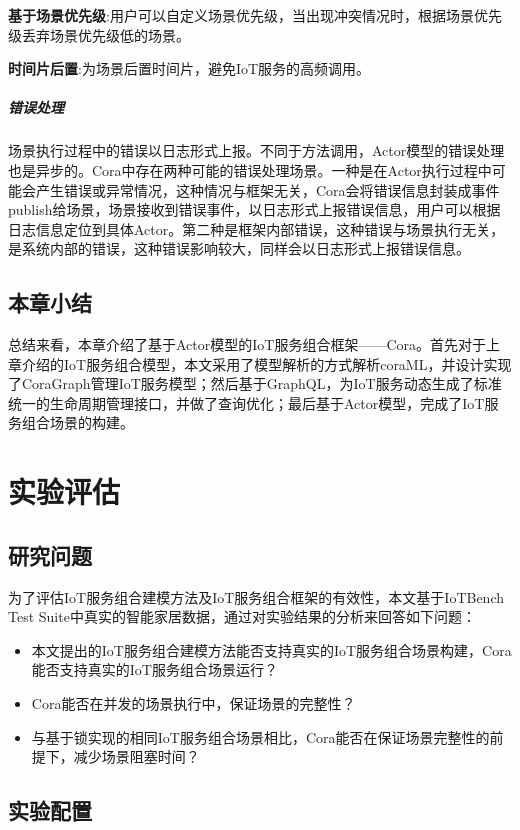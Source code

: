 \documentclass[winfonts,master,twoside]{njuthesis}
\begin{document}
\textbf{基于场景优先级}:用户可以自定义场景优先级，当出现冲突情况时，根据场景优先级丢弃场景优先级低的场景。

\textbf{时间片后置}:为场景后置时间片，避免IoT服务的高频调用。

\paragraph{错误处理}
场景执行过程中的错误以日志形式上报。不同于方法调用，Actor模型的错误处理也是异步的。Cora中存在两种可能的错误处理场景。一种是在Actor执行过程中可能会产生错误或异常情况，这种情况与框架无关，Cora会将错误信息封装成事件publish给场景，场景接收到错误事件，以日志形式上报错误信息，用户可以根据日志信息定位到具体Actor。第二种是框架内部错误，这种错误与场景执行无关，是系统内部的错误，这种错误影响较大，同样会以日志形式上报错误信息。

\section{本章小结}
总结来看，本章介绍了基于Actor模型的IoT服务组合框架——Cora。首先对于上章介绍的IoT服务组合模型，本文采用了模型解析的方式解析coraML，并设计实现了CoraGraph管理IoT服务模型；然后基于GraphQL，为IoT服务动态生成了标准统一的生命周期管理接口，并做了查询优化；最后基于Actor模型，完成了IoT服务组合场景的构建。

\chapter{实验评估}

\section{研究问题}
为了评估IoT服务组合建模方法及IoT服务组合框架的有效性，本文基于IoTBench Test Suite中真实的智能家居数据，通过对实验结果的分析来回答如下问题：
\begin{itemize}
	\item 本文提出的IoT服务组合建模方法能否支持真实的IoT服务组合场景构建，Cora能否支持真实的IoT服务组合场景运行？
	\item Cora能否在并发的场景执行中，保证场景的完整性？
	\item 与基于锁实现的相同IoT服务组合场景相比，Cora能否在保证场景完整性的前提下，减少场景阻塞时间？
\end{itemize}

\section{实验配置}
\end{document}
